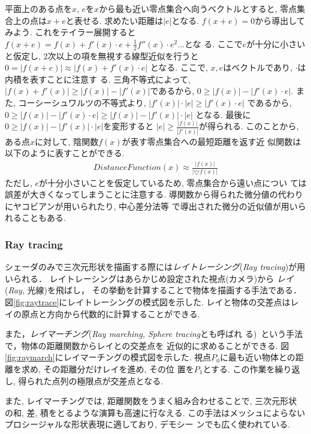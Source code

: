 平面上のある点を$x$, $e$を$x$から最も近い零点集合へ向うベクトルとすると,
零点集合上の点は$x + e$と表せる.
求めたい距離は$|e|$となる.
$f(x + e) = 0$から導出してみよう.
これをテイラー展開すると
$f(x + e) = f(x) + f'(x) \cdot e  + \frac{1}{2}f''(x) \cdot e^2 ...$とな
る. ここで$e$が十分に小さいと仮定し, 2次以上の項を無視する線型近似を行うと
$0=|f(x + e)| \approx |f(x) + f'(x) \cdot e|$
となる. ここで, $x, e$はベクトルであり, $\cdot$は内積を表すことに注意す
る.
三角不等式によって, $| f(x) + f'(x) | \geq |f(x)| - |f'(x)|$であるから,
$0 \geq |f(x)| - |f'(x) \cdot e|$.
また, コーシーシュワルツの不等式より,
$|f'(x)| \cdot |e| \geq | f'(x)\cdot e|$
であるから,
$0 \geq |f(x)| - |f'(x) \cdot e| \geq |f(x)| - |f'(x)| \cdot |e|$
となる.
最後に$0 \geq |f(x)| - |f'(x)| \cdot |e|$を変形すると
$|e| \geq \frac{|f(x)|}{|f'(x)|}$が得られる.
このことから, ある点$x$に対して, 陰関数$f(x)$が表す零点集合への最短距離を返す近
似関数は以下のように表すことができる.
\begin{align*}
 DistanceFunction(x) \approx \frac{|f(x)|}{|\bigtriangledown f(x)|}
\end{align*}
ただし, $e$が十分小さいことを仮定しているため, 零点集合から遠い点につい
ては誤差が大きくなってしまうことに注意する.
導関数から得られた微分値の代わりにヤコビアンが用いられたり, 中心差分法等
で導出された微分の近似値が用いられることもある.

\subsubsection{Ray tracing}

シェーダのみで三次元形状を描画する際には\emph{レイトレーシング}({\it Ray
tracing})が用いられる．
レイトレーシングはあらかじめ設定された視点(カメラ)から
\emph{レイ}({\it Ray}, 光線)を飛ばし，
その挙動を計算することで物体を描画する手法である．
図\ref{fig:raytrace}にレイトレーシングの模式図を示した.
レイと物体の交差点はレイの原点と方向から代数的に計算することができる.

また，\emph{レイマーチング}({\it Ray marching, Sphere tracing}とも呼ばれ
る)~\cite{hart1996sphere}という手法で，物体の距離関数からレイとの交差点を
近似的に求めることができる.
図\ref{fig:raymarch}にレイマーチングの模式図を示した.
視点$P_0$に最も近い物体との距離を求め, その距離分だけレイを進め, その位
置を$P_1$とする.
この作業を繰り返し, 得られた点列の極限点が交差点となる.

また, レイマーチングでは, 距離関数をうまく組み合わせることで, 三次元形状
の和, 差, 積をとるような演算も高速に行なえる.
この手法はメッシュによらないプロシージャルな形状表現に適しており, デモシー
ンでも広く使われている.

